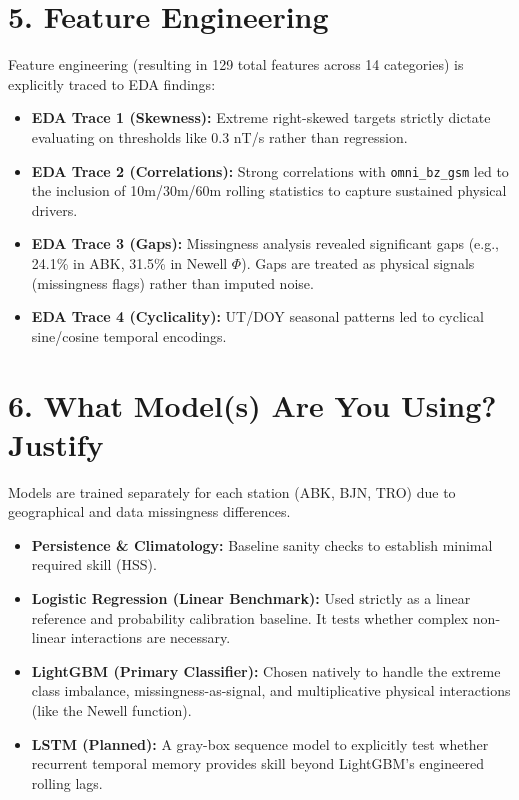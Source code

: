 \documentclass{article}
\begin{document}
\section*{5. Feature Engineering}
Feature engineering (resulting in 129 total features across 14 categories) is explicitly traced to EDA findings:
\begin{itemize}[noitemsep]
    \item \textbf{EDA Trace 1 (Skewness):} Extreme right-skewed targets strictly dictate evaluating on thresholds like 0.3 nT/s rather than regression.
    \item \textbf{EDA Trace 2 (Correlations):} Strong correlations with \texttt{omni\_bz\_gsm} led to the inclusion of 10m/30m/60m rolling statistics to capture sustained physical drivers.
    \item \textbf{EDA Trace 3 (Gaps):} Missingness analysis revealed significant gaps (e.g., 24.1\% in ABK, 31.5\% in Newell $\Phi$). Gaps are treated as physical signals (missingness flags) rather than imputed noise.
    \item \textbf{EDA Trace 4 (Cyclicality):} UT/DOY seasonal patterns led to cyclical sine/cosine temporal encodings.
\end{itemize}

\section*{6. What Model(s) Are You Using? Justify}
Models are trained separately for each station (ABK, BJN, TRO) due to geographical and data missingness differences. 
\begin{itemize}[noitemsep]
    \item \textbf{Persistence \& Climatology:} Baseline sanity checks to establish minimal required skill (HSS).
    \item \textbf{Logistic Regression (Linear Benchmark):} Used strictly as a linear reference and probability calibration baseline. It tests whether complex non-linear interactions are necessary.
    \item \textbf{LightGBM (Primary Classifier):} Chosen natively to handle the extreme class imbalance, missingness-as-signal, and multiplicative physical interactions (like the Newell function).
    \item \textbf{LSTM (Planned):} A gray-box sequence model to explicitly test whether recurrent temporal memory provides skill beyond LightGBM's engineered rolling lags.
\end{itemize}
\end{document}
